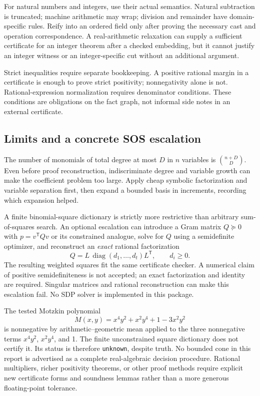\documentclass[11pt,a4paper]{article}
\newcommand{\code}[1]{\texttt{\small #1}}
\begin{document}
For natural numbers and integers, use their actual semantics. Natural
subtraction is truncated; machine arithmetic may wrap; division and remainder
have domain-specific rules. Reify into an ordered field only after proving the
necessary cast and operation correspondence. A real-arithmetic relaxation can
supply a sufficient certificate for an integer theorem after a checked
embedding, but it cannot justify an integer witness or an integer-specific cut
without an additional argument.

Strict inequalities require separate bookkeeping. A positive rational margin
in a certificate is enough to prove strict positivity; nonnegativity alone is
not. Rational-expression normalization requires denominator conditions. These
conditions are obligations on the fact graph, not informal side notes in an
external certificate.

\subsection{Limits and a concrete SOS escalation}

The number of monomials of total degree at most $D$ in $n$ variables is
$\binom{n+D}{D}$. Even before proof reconstruction, indiscriminate degree and
variable growth can make the coefficient problem too large. Apply cheap
symbolic factorization and variable separation first, then expand a bounded
basis in increments, recording which expansion helped.

A finite binomial-square dictionary is strictly more restrictive than arbitrary
sum-of-squares search. An optional escalation can introduce a Gram matrix
$Q\succeq0$ with $p=v^{\mathsf T}Qv$ or its constrained analogue, solve for $Q$
using a semidefinite optimizer, and reconstruct an \emph{exact} rational
factorization
\[
 Q=L\,\operatorname{diag}(d_1,\ldots,d_t)L^{\mathsf T},\qquad d_i\geq0.
\]
The resulting weighted squares fit the same certificate checker. A numerical
claim of positive semidefiniteness is not accepted; an exact factorization and
identity are required. Singular matrices and rational reconstruction can make
this escalation fail. No SDP solver is implemented in this package.

The tested Motzkin polynomial
\[
 M(x,y)=x^4y^2+x^2y^4+1-3x^2y^2
\]
is nonnegative by arithmetic--geometric mean applied to the three nonnegative
terms $x^4y^2$, $x^2y^4$, and 1. The finite unconstrained square dictionary does
not certify it. Its status is therefore \code{unknown}, despite truth. No
bounded cone in this report is advertised as a complete real-algebraic decision
procedure. Rational multipliers, richer positivity theorems, or other proof
methods require explicit new certificate forms and soundness lemmas rather
than a more generous floating-point tolerance.
\end{document}
